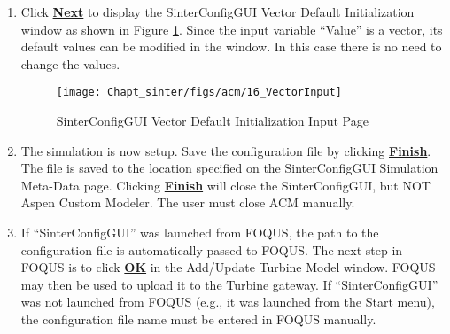 \begin{enumerate}
\item Click \textbf{\underline{Next}} to display the SinterConfigGUI
  Vector Default Initialization window as shown in Figure
  \ref{fig.sinter.acm.vectorinput}. Since the input variable ``Value''
  is a vector, its default values can be modified in the window.  In
  this case there is no need to change the values.
\begin{figure}[H]
	\begin{center}
		\texttt{[image: Chapt\_sinter/figs/acm/16\_VectorInput]}
		\caption{SinterConfigGUI Vector Default Initialization Input Page}
		\label{fig.sinter.acm.vectorinput}
	\end{center}
\end{figure}
\item The simulation is now setup. Save the configuration file by
  clicking \textbf{\underline{Finish}}. The file is 
  saved to the location specified on the SinterConfigGUI Simulation Meta-Data page. Clicking
  \textbf{\underline{Finish}} will close the SinterConfigGUI, but NOT
  Aspen Custom Modeler.  The user must close ACM manually.

\item If ``SinterConfigGUI'' was launched from FOQUS, the path to the configuration file is
 automatically passed to FOQUS.  The next step in FOQUS is to click
 \textbf{\underline{OK}} in the Add/Update Turbine
     Model window.  FOQUS may then be used to upload it to the Turbine gateway. If ``SinterConfigGUI'' was not launched from FOQUS (e.g., it was
  launched from the Start menu), the configuration file name must be entered in FOQUS manually.
\end{enumerate}
